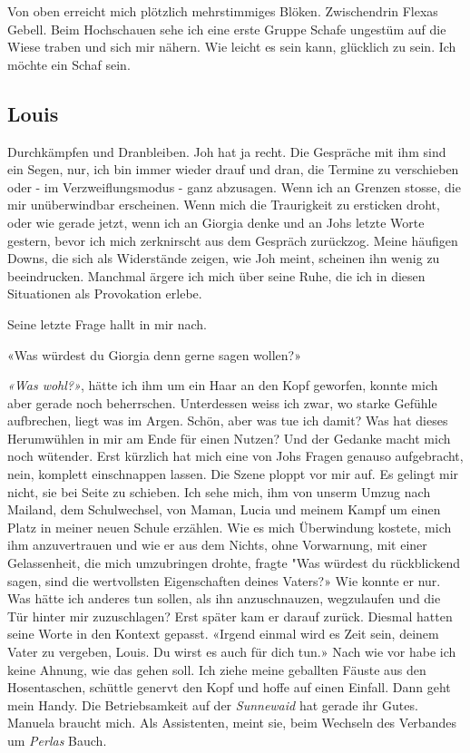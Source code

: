 Von oben erreicht mich plötzlich mehrstimmiges Blöken. Zwischendrin 
Flexas Gebell. Beim Hochschauen sehe ich eine erste Gruppe Schafe
ungestüm auf die Wiese traben und sich mir nähern. Wie leicht es sein
kann, glücklich zu sein. Ich möchte ein Schaf sein.

\subsection{Louis}

Durchkämpfen und Dranbleiben. Joh hat ja recht.
Die Gespräche mit ihm sind ein Segen, nur, ich bin immer wieder drauf
und dran, die Termine zu verschieben oder - im Verzweiflungsmodus - ganz
abzusagen. Wenn ich an Grenzen stosse, die mir unüberwindbar erscheinen.
Wenn mich die Traurigkeit zu ersticken droht, oder wie gerade jetzt, 
wenn ich an Giorgia denke und an Johs letzte Worte gestern, bevor ich
mich zerknirscht aus dem Gespräch zurückzog. Meine häufigen Downs, die
sich als Widerstände zeigen, wie Joh meint, scheinen ihn wenig zu
beeindrucken. Manchmal ärgere ich mich über seine Ruhe, die ich in
diesen Situationen als Provokation erlebe.

Seine letzte Frage hallt in mir nach.

«Was würdest du Giorgia denn gerne sagen wollen?»

\emph{«Was wohl?»}, hätte ich ihm um ein Haar an den Kopf geworfen,
konnte mich aber gerade noch beherrschen. Unterdessen weiss ich zwar, wo
starke Gefühle aufbrechen, liegt was im Argen. Schön, aber was tue ich
damit? Was hat dieses Herumwühlen in mir am Ende für einen Nutzen? Und
der Gedanke macht mich noch wütender. Erst kürzlich hat mich eine von Johs Fragen genauso 
aufgebracht, nein, komplett einschnappen lassen. Die Szene ploppt vor mir auf. Es gelingt mir nicht, sie bei Seite zu schieben. 
Ich sehe mich, ihm von unserm Umzug nach Mailand, dem Schulwechsel, von Maman, Lucia und meinem Kampf um einen Platz in meiner neuen Schule erzählen. Wie es mich Überwindung kostete, mich ihm anzuvertrauen und wie er aus dem Nichts, ohne Vorwarnung, mit einer Gelassenheit, die mich umzubringen drohte, fragte "Was würdest du rückblickend sagen, sind die wertvollsten Eigenschaften deines Vaters?» Wie konnte er nur. Was hätte ich anderes tun sollen, als ihn anzuschnauzen, wegzulaufen und die Tür hinter mir zuzuschlagen? 
Erst später kam er darauf zurück. Diesmal hatten seine Worte in den Kontext gepasst.
«Irgend einmal wird es Zeit sein, deinem Vater zu vergeben, Louis. Du wirst es auch für dich tun.»
Nach wie vor habe ich keine Ahnung, wie das gehen soll. Ich ziehe meine geballten Fäuste aus den Hosentaschen, schüttle genervt den Kopf und hoffe auf einen Einfall. Dann geht mein Handy. Die
Betriebsamkeit auf der \emph{Sunnewaid} hat gerade ihr Gutes. Manuela
braucht mich. Als Assistenten, meint sie, beim Wechseln des Verbandes um
\emph{Perlas} Bauch.

